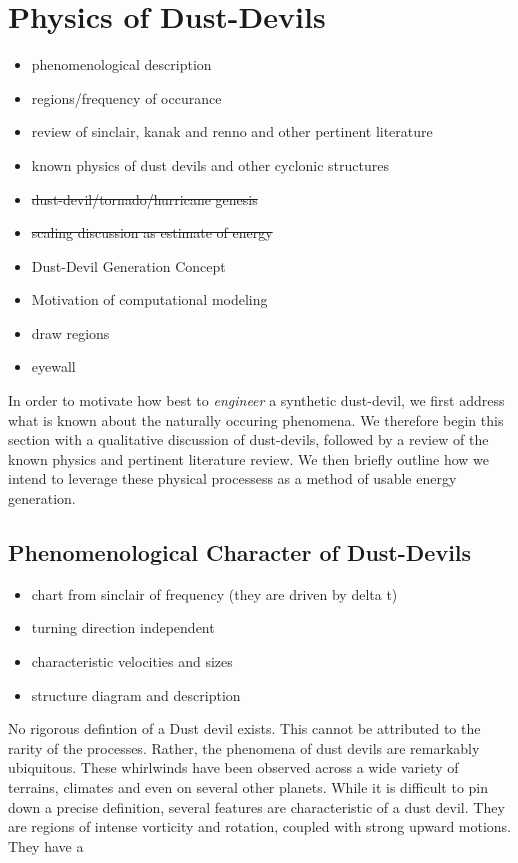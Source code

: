 \section{Physics of Dust-Devils}
\label{sec:physics}
\begin{itemize}
\item phenomenological description
\item regions/frequency of occurance
\item review of sinclair, kanak and renno and other pertinent literature
\item known physics of dust devils and other cyclonic structures
\item \st{dust-devil/tornado/hurricane genesis}
\item \st{scaling discussion as estimate of energy}
\item Dust-Devil Generation Concept
\item Motivation of computational modeling
\item draw regions
\item eyewall
\end{itemize}

In order to motivate how best to \textit{engineer} a synthetic
dust-devil, we first address what is known about the naturally occuring
phenomena. We therefore begin this section with a qualitative discussion
of dust-devils, followed by a review of the known physics and pertinent 
literature review. We then briefly outline how we intend to leverage
these physical processess as a method of usable energy generation. 


\subsection{Phenomenological Character of Dust-Devils}
\begin{itemize}
 \item chart from sinclair of frequency (they are driven by delta t)
 \item turning direction independent
 \item characteristic velocities and sizes
 \item structure diagram and description
\end{itemize}

No rigorous defintion of a Dust devil exists. This cannot be attributed
to the rarity of the processes. Rather, the phenomena of dust devils are
remarkably ubiquitous. These whirlwinds have been
observed across a wide variety of terrains, climates and even on several
other planets. While it is difficult to pin down a precise definition,
several features are characteristic of a dust devil. They are regions of
intense vorticity and rotation, coupled with strong upward motions. They
have a 

